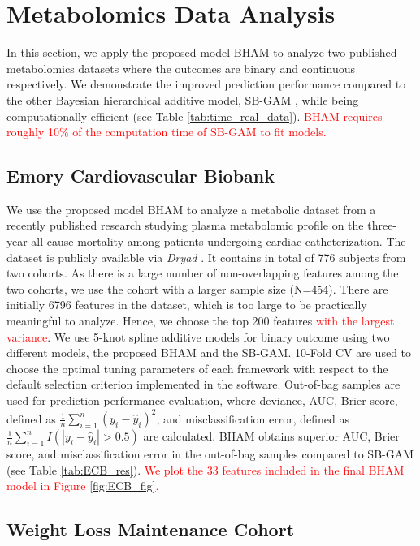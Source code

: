 \documentclass[AMA,STIX1COL,]{WileyNJD-v2}
\begin{document}
\section{Metabolomics Data Analysis}
\label{sec:real_data}

In this section, we apply the proposed model BHAM to analyze two
published metabolomics datasets where the outcomes are binary and
continuous respectively. We demonstrate the improved prediction
performance compared to the other Bayesian hierarchical additive model,
SB-GAM \citep{Bai2021}, while being computationally efficient (see Table
\ref{tab:time_real_data}).
\textcolor{red}{BHAM requires roughly 10\% of the computation time of SB-GAM to fit models.}

\subsection{Emory Cardiovascular Biobank}
\label{sec:ECB}

We use the proposed model BHAM to analyze a metabolic dataset from a
recently published research \citep{Mehta2020} studying plasma
metabolomic profile on the three-year all-cause mortality among patients
undergoing cardiac catheterization. The dataset is publicly available
via \textit{Dryad} \citep{Mehta2020_data}. It contains in total of 776
subjects from two cohorts. As there is a large number of non-overlapping
features among the two cohorts, we use the cohort with a larger sample
size (N=454). There are initially 6796 features in the dataset, which is
too large to be practically meaningful to analyze. Hence, we choose the
top 200 features \textcolor{red}{with the largest variance}. We use
5-knot spline additive models for binary outcome using two different
models, the proposed BHAM and the SB-GAM. 10-Fold CV are used to choose
the optimal tuning parameters of each framework with respect to the
default selection criterion implemented in the software. Out-of-bag
samples are used for prediction performance evaluation, where deviance,
AUC, Brier score, defined as
\(\frac{1}{n}\sum\limits^{n}_{i=1}(y_i - \hat y_i)^2\), and
misclassification error, defined as
\(\frac{1}{n}\sum\limits^{n}_{i=1}I(|y_i - \hat y_i|>0.5)\) are
calculated. BHAM obtains superior AUC, Brier score, and
misclassification error in the out-of-bag samples compared to SB-GAM
(see Table \ref{tab:ECB_res}).
\textcolor{red}{We plot the 33 features included in the final BHAM model in Figure \ref{fig:ECB_fig}.}

\subsection{Weight Loss Maintenance Cohort}
\end{document}
